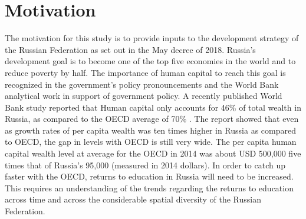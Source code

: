 \documentclass[alpha-refs]{wiley-article-04t}
\begin{document}
\newpage

\section{Motivation}


The motivation for this study is to provide inputs to the development 
strategy of the Russian Federation as set out in the May decree of 2018. 
Russia's development goal is to become one of the top five economies in 
the world and to reduce poverty by half. The importance of human capital to 
reach this goal is recognized in the government's policy pronouncements and 
the World Bank analytical work in support of government policy. 
A recently published World Bank study reported that Human capital  only 
accounts for 46\% of total wealth in Russia, as compared to the OECD 
average of 70\% \parencite{Naikal2019}. The report showed that even as 
growth rates of per capita  wealth was ten times higher in Russia as 
compared to OECD, the gap in levels with OECD is still very wide. The per 
capita human capital wealth  level at average for the OECD in 2014 was 
about USD 500,000 \textendash  five times that of Russia's 95,000 (measured 
in  2014 dollars). In order to catch up faster with the OECD, returns to 
education  in Russia will need to be increased. This requires an 
understanding of the trends regarding the returns to education across time 
and across the considerable spatial diversity of the Russian Federation. 

\vspace{1em}

\noindent{}
\end{document}
